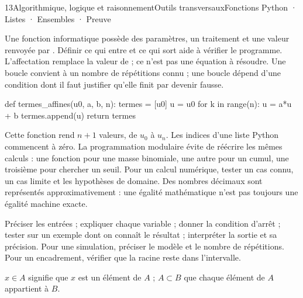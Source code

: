 \begin{ouverture}[conditions]{13}{Algorithmique, logique et raisonnement}{Outils transversaux}{Fonctions Python · Listes · Ensembles · Preuve}
\end{ouverture}
\essentiel

Une fonction informatique possède des paramètres, un traitement et une valeur renvoyée par . Définir ce qui entre et ce qui sort aide à vérifier le programme.
L'affectation  remplace la valeur de  ; ce n'est pas une équation à résoudre.
Une boucle  convient à un nombre de répétitions connu ; une boucle  dépend d'une condition dont il faut justifier qu'elle finit par devenir fausse.
\begin{python}
def termes_affines(u0, a, b, n):
    termes = [u0]
    u = u0
    for k in range(n):
        u = a*u + b
        termes.append(u)
    return termes
\end{python}
Cette fonction rend $n+1$ valeurs, de $u_0$ à $u_n$. Les indices d'une liste Python commencent à zéro.
La programmation modulaire évite de réécrire les mêmes calculs : une fonction pour une masse binomiale, une autre pour un cumul, une troisième pour chercher un seuil.
Pour un calcul numérique, tester un cas connu, un cas limite et les hypothèses de domaine. Des nombres décimaux sont représentés approximativement : une égalité mathématique n'est pas toujours une égalité machine exacte.
\begin{savoirfaire}
Préciser les entrées ; expliquer chaque variable ; donner la condition d'arrêt ; tester sur un exemple dont on connaît le résultat ; interpréter la sortie et sa précision.
Pour une simulation, préciser le modèle et le nombre de répétitions. Pour un encadrement, vérifier que la racine reste dans l'intervalle.
\end{savoirfaire}
$x\in A$ signifie que $x$ est un élément de $A$ ; $A\subset B$ que chaque élément de $A$ appartient à $B$.
